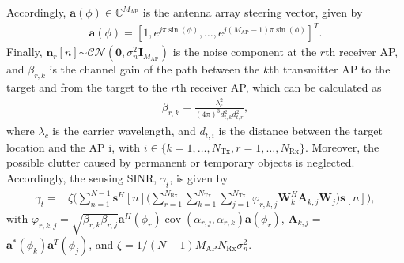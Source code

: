 \documentclass[conference,twocolumn,a4paper]{IEEEtran}
\theoremstyle{remark} \newtheorem{remark}{Remark}
\begin{document}
Accordingly, $\mathbf{a}(\phi) \in \mathbb{C}^{M_{\mathrm{AP}}}$ is the antenna array steering vector, given by
\begin{align}
    \mathbf{a}(\phi)\!\!=\!\!\left[
        1, e^{j\pi\sin(\phi)}, \dots, e^{j(M_{\mathrm{AP}}\!-\!1)\pi\sin(\phi)}\right]^T\!\!\!\!.
\end{align}
Finally, $\mathbf{n}_r[n]$$\sim$$\mathcal{CN}(\mathbf{0},\sigma_n^2\mathbf{I}_{M_{\mathrm{AP}}})$ is the noise component at the $r$th receiver AP, and $\beta_{r,k}$ is the channel gain of the path between the $k$th transmitter AP to the target and from the target to the $r$th receiver AP, which can be calculated as~\cite{Art:Emil} %
\begin{align}
    \beta_{r,k} = \frac{\lambda_c^2}{(4\pi)^3d_{t,k}^2d_{t,r}^2},
\end{align}
where $\lambda_c$ is the carrier wavelength, and $d_{t,i}$ is the distance between the target location and the AP i, with $i \in \{k = 1, \dots, N_{\mathrm{Tx}},r = 1, \dots, N_{\mathrm{Rx}}\}$. Moreover, the possible clutter caused by permanent or temporary objects is neglected. Accordingly, the sensing SINR, $\gamma_t$, is given by%
\begin{align}\label{eq:gammat}
    \gamma_t\!=&\zeta\!\Bigg(\!\sum_{n=1}^{N-1}\!\!\mathbf{s}^H\![n]\!\Bigg(\!\sum_{r=1}^{N_{\mathrm{Rx}}}\! \sum_{k=1}^{N_{\mathrm{Tx}}}\! \sum_{j=1}^{N_{\mathrm{Tx}}}\! \varphi_{r,k,j}\mathbf{W}_k^H\mathbf{A}_{k,j}\mathbf{W}_j\!\Bigg) \!\mathbf{s}[n]\!\Bigg)\!,
\end{align}
with $\varphi_{r,k,j} = \sqrt{\beta_{r,k} \beta_{r,j}}\mathbf{a}^H\left(\phi_r\right)\operatorname{cov}\left(\alpha_{r, j}, \alpha_{r, k}\right) \mathbf{a}\left(\phi_r\right)$, $\mathbf{A}_{k,j}$$=$$\mathbf{a}^*\!\left(\phi_k\right)\mathbf{a}^T\!\left(\phi_j\right)$, and $\zeta$$=$$1/(N\!-1\!)M_{\mathrm{AP}}N_{\mathrm{Rx}}\sigma_n^2$.
\end{document}
